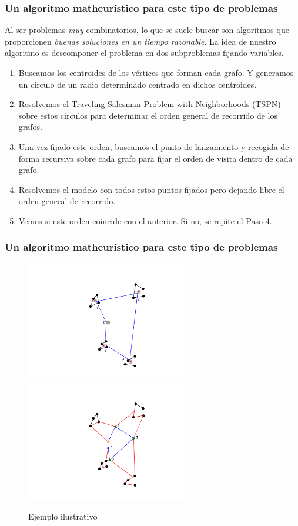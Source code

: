 \documentclass[slidestop,usepdftitle=false, xcolor=table]{beamer}
\begin{document}
	\begin{frame}
		\frametitle{Un algoritmo matheurístico para este tipo de problemas}
		Al ser problemas \textit{muy} combinatorios, lo que se suele buscar son algoritmos que proporcionen \textit{buenas soluciones en un tiempo razonable}. La idea de nuestro algoritmo es descomponer el problema en dos subproblemas fijando variables.
		\begin{footnotesize}
			\begin{enumerate}
				\item Buscamos los centroides de los vértices que forman cada grafo. Y generamos un círculo de un radio determinado centrado en dichos centroides.
				\item Resolvemos el Traveling Salesman Problem with Neighborhoods (TSPN) sobre estos círculos para determinar el orden general de recorrido de los grafos.
				\item Una vez fijado este orden, buscamos el punto de lanzamiento y recogida de forma recursiva sobre cada grafo para fijar el orden de visita dentro de cada grafo.
				\item Resolvemos el modelo con todos estos puntos fijados pero dejando libre el orden general de recorrido.
				\item Vemos si este orden coincide con el anterior. Si no, se repite el Paso 4.
			\end{enumerate}
		\end{footnotesize}
	\end{frame}

	\begin{frame}
		\frametitle{Un algoritmo matheurístico para este tipo de problemas}
			\begin{figure}%
				\hspace{-2.5cm}
		    \includegraphics[width=7cm]{step0}\hspace{-1.5cm}\includegraphics[width=7cm]{step1}%
		    \caption{Ejemplo ilustrativo}%
		    \label{fig:example}%
			\end{figure}
	\end{frame}
\end{document}
